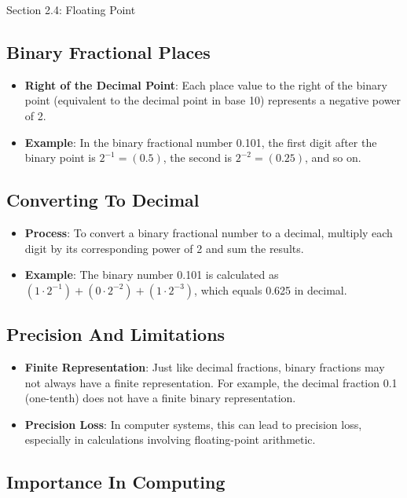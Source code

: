 \begin{notes}{Section 2.4: Floating Point}
    \subsection*{Binary Fractional Places}

    \begin{itemize}
        \item \textbf{Right of the Decimal Point}: Each place value to the right of the binary point (equivalent to the decimal point in base 10) represents a negative power of 2.
        \item \textbf{Example}: In the binary fractional number 0.101, the first digit after the binary point is $2^{-1} = (0.5)$, the second is $2^{-2} = (0.25)$, and so on.
    \end{itemize}

    \subsection*{Converting To Decimal}

    \begin{itemize}
        \item \textbf{Process}: To convert a binary fractional number to a decimal, multiply each digit by its corresponding power of 2 and sum the results.
        \item \textbf{Example}: The binary number 0.101 is calculated as $(1 \cdot 2^{-1}) + (0 \cdot 2^{-2}) + (1 \cdot 2^{-3})$, which equals 0.625 in decimal.
    \end{itemize}

    \subsection*{Precision And Limitations}

    \begin{itemize}
        \item \textbf{Finite Representation}: Just like decimal fractions, binary fractions may not always have a finite representation. For example, the decimal fraction 0.1 (one-tenth) does not have 
        a finite binary representation.
        \item \textbf{Precision Loss}: In computer systems, this can lead to precision loss, especially in calculations involving floating-point arithmetic.
    \end{itemize}

    \subsection*{Importance In Computing}


\end{notes}
